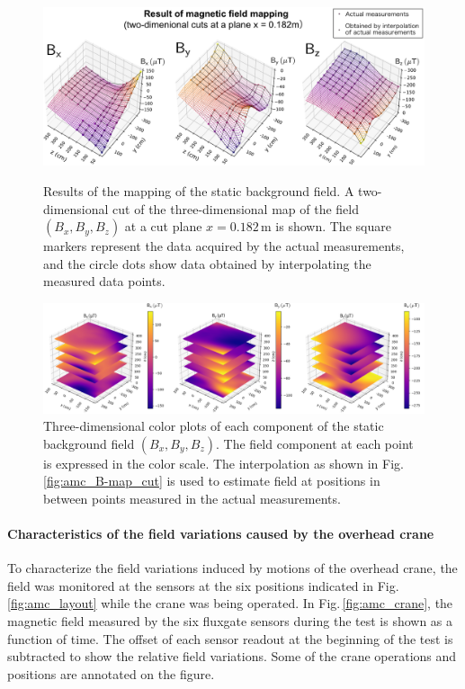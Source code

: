 \begin{figure}[htb!]
  \centering
  \includegraphics[width=\textwidth]{graphics/AMC/B-field_cut_CDR.pdf}
  \caption{Results of the mapping of the static background field. A two-dimensional cut of the three-dimensional map of the field $(B_{x}, B_{y}, B_{z})$ at a cut plane $x=0.182\,\mathrm{m}$ is shown. The square markers represent the data acquired by the actual measurements, and the circle dots show data obtained by interpolating the measured data points.}
  \label{fig:amc_B-map_cut}
  \vspace{1.5em}
  \includegraphics[width=1.02\textwidth]{graphics/AMC/B-field_3D.png}
  \caption{Three-dimensional color plots of each component of the static background field $(B_{x}, B_{y}, B_{z})$. The field component at each point is expressed in the color scale. The interpolation as shown in Fig.\,\ref{fig:amc_B-map_cut} is used to estimate field at positions in between points measured in the actual measurements. }
  \label{fig:amc_B-map_3D}
\end{figure}


\paragraph*{Characteristics of the field variations caused by the overhead crane}
To characterize the field variations induced by motions of the overhead crane, the field was monitored at the sensors at the six positions indicated in Fig.\,\ref{fig:amc_layout} while the crane was being operated.  
In Fig.\,\ref{fig:amc_crane}, the magnetic field measured by the six fluxgate sensors during the test is shown as a function of time. The offset of each sensor readout at the beginning of the test is subtracted to show the relative field variations. Some of the crane operations and positions are annotated on the figure. 

